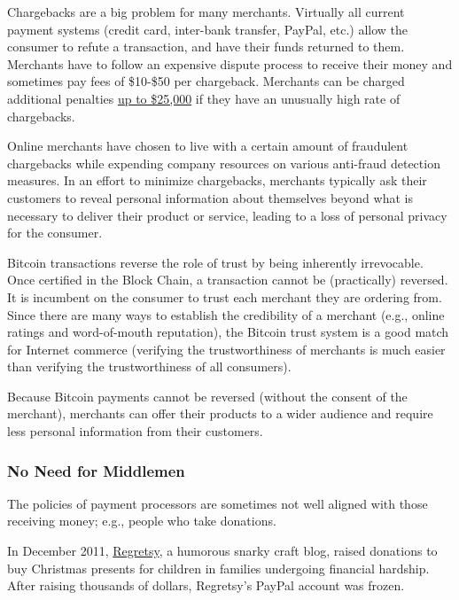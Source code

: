 \documentclass[12pt,twocolumn]{article}
\begin{document}
Chargebacks are a big problem for many merchants. Virtually all current
payment systems (credit card, inter-bank transfer, PayPal, etc.) allow
the consumer to refute a transaction, and have their funds returned to
them. Merchants have to follow an expensive dispute process to receive
their money and sometimes pay fees of \$10-\$50 per chargeback.
Merchants can be charged additional penalties
\href{http://www.internetretailer.com/2003/09/04/visa-to-lower-fee-inducing-chargeback-ratio-to-1-of-transaction}{up
to \$25,000} if they have an unusually high rate of chargebacks.

Online merchants have chosen to live with a certain amount of fraudulent
chargebacks while expending company resources on various anti-fraud
detection measures. In an effort to minimize chargebacks, merchants
typically ask their customers to reveal personal information about
themselves beyond what is necessary to deliver their product or service,
leading to a loss of personal privacy for the consumer.

Bitcoin transactions reverse the role of trust by being inherently
irrevocable. Once certified in the Block Chain, a transaction cannot be
(practically) reversed. It is incumbent on the consumer to trust each
merchant they are ordering from. Since there are many ways to establish
the credibility of a merchant (e.g., online ratings and word-of-mouth
reputation), the Bitcoin trust system is a good match for Internet
commerce (verifying the trustworthiness of merchants is much easier than
verifying the trustworthiness of all consumers).

Because Bitcoin payments cannot be reversed (without the consent of the
merchant), merchants can offer their products to a wider audience and
require less personal information from their customers.

\subsubsection{No Need for Middlemen}

The policies of payment processors are sometimes not well aligned with
those receiving money; e.g., people who take donations.

In December 2011,
\href{http://www.regretsy.com/2011/12/05/cats-1-kids-0/}{Regretsy}, a
humorous snarky craft blog, raised donations to buy Christmas presents
for children in families undergoing financial hardship. After raising
thousands of dollars, Regretsy's PayPal account was frozen.
\end{document}
